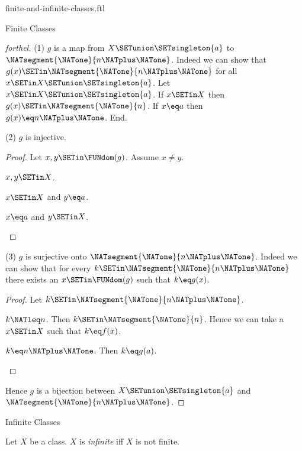 \documentclass{naproche-library}
\begin{document}
\begin{smodule}[title=Finite and Infinite Classes]{finite-and-infinite-classes.ftl}
\begin{sfragment}{Finite Classes}
\begin{proof}[forthel]
    (1) $g$ is a map from $X \SETunion \SETsingleton{a}$ to $\NATsegment{\NATone}{n \NATplus \NATone}$.
    Indeed we can show that $g(x) \SETin \NATsegment{\NATone}{n \NATplus \NATone}$ for all $x \SETin X \SETunion \SETsingleton{a}$.
      Let $x \SETin X \SETunion \SETsingleton{a}$.
      If $x \SETin X$ then $g(x) \SETin \NATsegment{\NATone}{n}$.
      If $x \eq a$ then $g(x) \eq n \NATplus \NATone$.
    End.

    (2) $g$ is injective.
    \begin{proof}
      Let $x, y \SETin \FUNdom(g)$.
      Assume $x \neq y$.
      
      \begin{case}{$x, y \SETin X$.} \end{case}

      \begin{case}{$x \SETin X$ and $y \eq a$.} \end{case}

      \begin{case}{$x \eq a$ and $y \SETin X$.} \end{case}
    \end{proof}

    (3) $g$ is surjective onto $\NATsegment{\NATone}{n \NATplus \NATone}$.
    Indeed we can show that for every $k \SETin \NATsegment{\NATone}{n \NATplus \NATone}$ there exists an $x \SETin \FUNdom(g)$ such that $k \eq g(x)$.
    \begin{proof}
      Let $k \SETin \NATsegment{\NATone}{n \NATplus \NATone}$.

      \begin{case}{$k \NATleq n$.}
        Then $k \SETin \NATsegment{\NATone}{n}$.
        Hence we can take a $x \SETin X$ such that $k \eq f(x)$.
      \end{case}

      \begin{case}{$k \eq n \NATplus \NATone$.}
        Then $k \eq g(a)$.
      \end{case}
    \end{proof}

    Hence $g$ is a bijection between $X \SETunion \SETsingleton{a}$ and $\NATsegment{\NATone}{n \NATplus \NATone}$.
  \end{proof}
\end{sfragment}

\begin{sfragment}{Infinite Classes}
  \begin{definition}[forthel,id=FOUNDATIONS_14_6612510618681344]
    Let $X$ be a class.
    $X$ is \emph{infinite} iff $X$ is not finite.
  \end{definition}


\end{sfragment}
\end{smodule}
\end{document}
